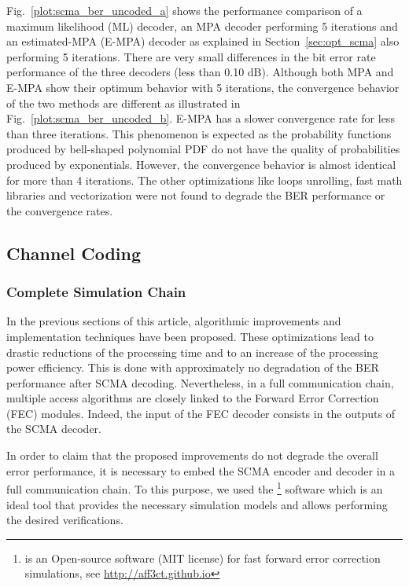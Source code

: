 Fig.~\ref{plot:scma_ber_uncoded_a} shows the performance comparison of a maximum
likelihood (ML) decoder, an MPA decoder performing 5 iterations and an
estimated-MPA (E-MPA) decoder as explained in Section~\ref{sec:opt_scma} also
performing 5 iterations. There are very small differences in the bit error rate
performance of the three decoders (less than 0.10 dB). Although both MPA and
E-MPA show their optimum behavior with 5 iterations, the convergence behavior of
the two methods are different as illustrated in
Fig.~\ref{plot:scma_ber_uncoded_b}. E-MPA has a slower convergence rate for less
than three iterations. This phenomenon is expected as the probability functions
produced by bell-shaped polynomial PDF do not have the quality of probabilities
produced by exponentials. However, the convergence behavior is almost identical
for more than 4 iterations. The other optimizations like loops unrolling, fast
math libraries and vectorization were not found to degrade the BER performance
or the convergence rates.

\subsection{Channel Coding}
\label{sec:scma_fec}

\subsubsection{Complete Simulation Chain}
\label{sec:scma_fec_chain}

In the previous sections of this article, algorithmic improvements and
implementation techniques have been proposed. These optimizations lead to
drastic reductions of the processing time and to an increase of the processing
power efficiency. This is done with approximately no degradation of the BER
performance after SCMA decoding. Nevertheless, in a full communication chain,
multiple access algorithms are closely linked to the Forward Error Correction
(FEC) modules. Indeed, the input of the FEC decoder consists in the outputs of
the SCMA decoder.

In order to claim that the proposed improvements do not degrade the overall
error performance, it is necessary to embed the SCMA encoder and decoder in a
full communication chain. To this purpose, we used the \AFFECT\footnote{\AFFECT
is an Open-source software (MIT license) for fast forward error correction
simulations, see \url{http://aff3ct.github.io}} software which is an ideal
tool that provides the necessary simulation models and allows performing the
desired verifications.

